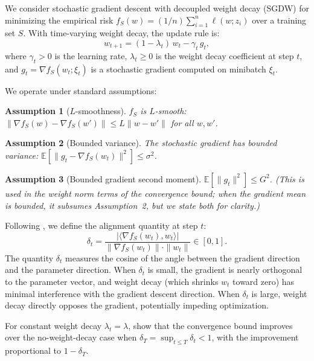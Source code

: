 \documentclass{article}
\newtheorem{assumption}{Assumption}
\begin{document}
We consider stochastic gradient descent with decoupled weight decay (SGDW) for
minimizing the empirical risk
$f_S(w) = (1/n)\sum_{i=1}^{n} \ell(w; z_i)$ over a training set $S$.
With time-varying weight decay, the update rule is:
\begin{equation}
  w_{t+1} = (1 - \lambda_t)\, w_t - \gamma_t\, g_t,
  \label{eq:sgdw}
\end{equation}
where $\gamma_t > 0$ is the learning rate, $\lambda_t \geq 0$ is the weight decay
coefficient at step $t$, and $g_t = \nabla f_S(w_t; \xi_t)$ is a stochastic gradient
computed on minibatch $\xi_t$.

We operate under standard assumptions:
\begin{assumption}[$L$-smoothness]
  $f_S$ is $L$-smooth:
  $\|\nabla f_S(w) - \nabla f_S(w')\| \leq L\|w - w'\|$ for all $w, w'$.
\end{assumption}
\begin{assumption}[Bounded variance]
  The stochastic gradient has bounded variance:
  $\mathbb{E}[\|g_t - \nabla f_S(w_t)\|^2] \leq \sigma^2$.
\end{assumption}
\begin{assumption}[Bounded gradient second moment]
  $\mathbb{E}[\|g_t\|^2] \leq G^2$.
  (This is used in the weight norm terms of the convergence bound; when the gradient
  mean is bounded, it subsumes Assumption~2, but we state both for clarity.)
\end{assumption}

Following \citet{xie2024investigating}, we define the alignment quantity at step $t$:
\begin{equation}
  \delta_t = \frac{|\langle \nabla f_S(w_t), w_t \rangle|}
                  {\|\nabla f_S(w_t)\| \cdot \|w_t\|} \in [0, 1].
  \label{eq:alignment}
\end{equation}
The quantity $\delta_t$ measures the cosine of the angle between the gradient
direction and the parameter direction.
When $\delta_t$ is small, the gradient is nearly orthogonal to the parameter vector,
and weight decay (which shrinks $w_t$ toward zero) has minimal interference with the
gradient descent direction.
When $\delta_t$ is large, weight decay directly opposes the gradient, potentially
impeding optimization.

For constant weight decay $\lambda_t = \lambda$, \citet{xie2024investigating} show
that the convergence bound improves over the no-weight-decay case when
$\delta_T = \sup_{t \leq T} \delta_t < 1$, with the improvement proportional to
$1 - \delta_T$.
\end{document}
